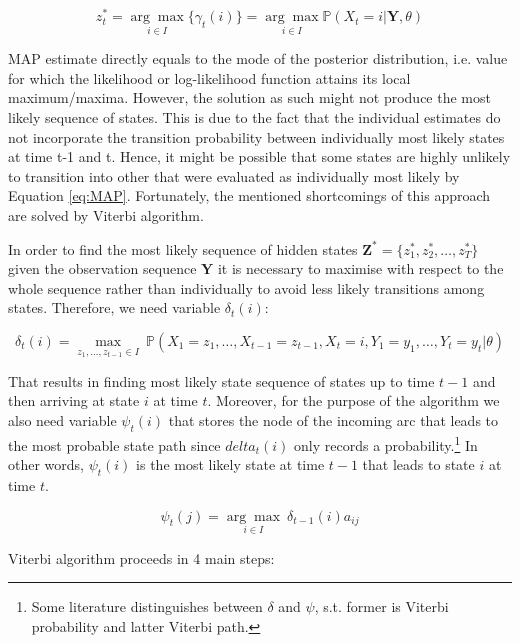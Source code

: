 \begin{equation}
    z_t^* = \underset{i \in I}{\arg\max} \{\gamma_t(i)\} = \underset{i \in I}{\arg\max} \mathbb{P}(X_t=i|\textbf{Y},\theta)
\end{equation}

MAP estimate directly equals to the mode of the posterior distribution, i.e. value for which the likelihood or log-likelihood function attains its local maximum/maxima. 
However, the solution as such might not produce the most likely sequence of states. This is due to the fact that the individual estimates do not incorporate 
the transition probability between individually most likely states at time t-1 and t. Hence, it might be possible that some states are highly unlikely to transition 
into other that were evaluated as individually most likely by Equation \ref{eq:MAP}. Fortunately, the mentioned shortcomings of this approach are solved by Viterbi algorithm.

In order to find the most likely sequence of hidden states $\textbf{Z}^*=\{z_1^*,z_2^*,\ldots,z_T^*\}$ given the observation sequence $\textbf{Y}$ it is necessary 
to maximise with respect to the whole sequence rather than individually to avoid less likely transitions among states.
Therefore, we need variable $\delta_t(i)$:

\begin{equation}
    \delta_t(i) = \underset{z_1,\ldots,z_{t-1} \in I}{\max}\: \mathbb{P}(X_1=z_1,\ldots,X_{t-1}=z_{t-1},X_t=i,Y_1 = y_1,\ldots,Y_{t}=y_t|\theta)
\end{equation}

That results in finding most likely state sequence of states up to time $t-1$ and then arriving at state $i$ at time $t$. Moreover, for the purpose of the algorithm we also need variable $\psi_t(i)$ 
that stores the node of the incoming arc that leads to the most probable state path since $delta_t(i)$ only records a probability.\footnote{Some literature distinguishes between $\delta$ and $\psi$, s.t. former is Viterbi probability and latter Viterbi path.} 
In other words, $\psi_t(i)$ is the most likely state at time $t-1$ that leads to state $i$ at time $t$.

\begin{equation}
\psi_t(j) = \underset{i \in I}{\arg\max} \: \delta_{t-1}(i)a_{ij}
\end{equation}

\noindent Viterbi algorithm proceeds in 4 main steps:

